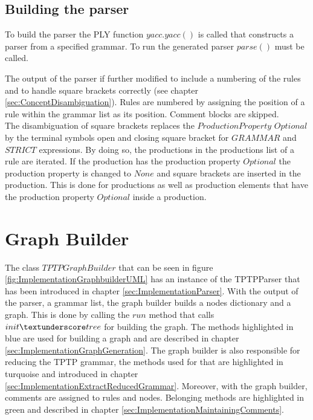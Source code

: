 \subsection{Building the parser}\label{sec:ImplementationRunParser}

To build the parser the \ac{PLY} function $yacc.yacc()$ is called that constructs a parser from a specified grammar. To run the generated parser $parse()$ must be called. 

The output of the parser if further modified to include a numbering of the rules and to handle square brackets correctly (see chapter \ref{sec:ConceptDisambiguation}).
Rules are numbered by assigning the position of a rule within the grammar list as its position. Comment blocks are skipped. \\
The disambiguation of square brackets replaces the $ProductionProperty$ $Optional$ by the terminal symbols open and closing square bracket for $GRAMMAR$ and $STRICT$ expressions.
By doing so, the productions in the productions list of a rule are iterated. If the production has the production property $Optional$ the production property is changed to $None$ and square brackets are inserted in the production. This is done for productions as well as production elements that have the production property $Optional$ inside a production.


\section{Graph Builder}\label{sec:ImplementationGraphBuilder}

The class $TPTPGraphBuilder$ that can be seen in figure \ref{fig:ImplementationGraphbuilderUML} has an instance of the TPTPParser that has been introduced in chapter \ref{sec:ImplementationParser}. With the output of the parser, a grammar list, the graph builder builds a nodes dictionary and a graph. This is done by calling the $run$ method that calls $init\textunderscore tree$ for building the graph.
The methods highlighted in blue are used for building a graph and are described in chapter \ref{sec:ImplementationGraphGeneration}. The graph builder is also responsible for reducing the \ac{TPTP} grammar, the methods used for that are highlighted in turquoise and introduced in chapter \ref{sec:ImplementationExtractReducedGrammar}. Moreover, with the graph builder, comments are assigned to rules and nodes. Belonging methods are highlighted in green and described in chapter \ref{sec:ImplementationMaintainingComments}.

